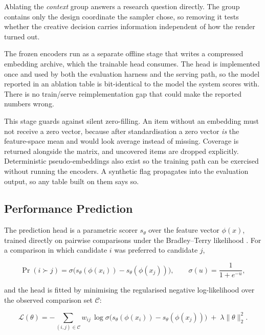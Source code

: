 \documentclass[conference]{IEEEtran}
\begin{document}
Ablating the \emph{context} group answers a research question directly. The group
contains only the design coordinate the sampler chose, so removing it tests whether
the creative decision carries information independent of how the render turned out.

The frozen encoders run as a separate offline stage that writes a compressed
embedding archive, which the trainable head consumes. The head is implemented once
and used by both the evaluation harness and the serving path, so the model reported
in an ablation table is bit-identical to the model the system scores with. There is
no train/serve reimplementation gap that could make the reported numbers wrong.

This stage guards against silent zero-filling. An item without an embedding must not
receive a zero vector, because after standardisation a zero vector \emph{is} the
feature-space mean and would look average instead of missing. Coverage is returned
alongside the matrix, and uncovered items are dropped explicitly. Deterministic
pseudo-embeddings also exist so the training path can be exercised without running
the encoders. A synthetic flag propagates into the evaluation output, so any table
built on them says so.

\subsection{Performance Prediction}
\label{sec:prediction}

The prediction head is a parametric scorer $s_\theta$ over the feature vector
$\phi(x)$, trained directly on pairwise comparisons under the Bradley--Terry
likelihood \cite{bradley1952,burges2005ranknet}. For a comparison in which
candidate $i$ was preferred to candidate $j$,

\begin{equation}
\Pr(i \succ j) = \sigma\big(s_\theta(\phi(x_i)) - s_\theta(\phi(x_j))\big),
\qquad \sigma(u) = \frac{1}{1+e^{-u}},
\label{eq:bt}
\end{equation}

and the head is fitted by minimising the regularised negative log-likelihood over
the observed comparison set $\mathcal{C}$:

\begin{equation}
\mathcal{L}(\theta) = -\!\!\sum_{(i,j)\in\mathcal{C}}\!\! w_{ij}\,
\log \sigma\big(s_\theta(\phi(x_i)) - s_\theta(\phi(x_j))\big)
\;+\; \lambda \lVert \theta \rVert_2^2 .
\label{eq:loss}
\end{equation}
\end{document}
